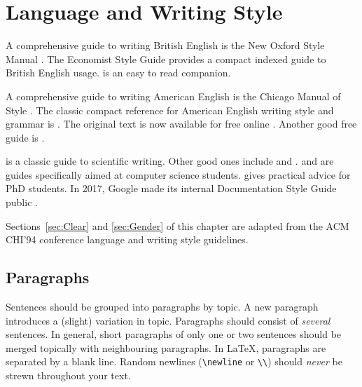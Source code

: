%
%
% 
% 
% 


\chapter{Language and Writing Style}

\label{chap:Style}


A comprehensive guide to writing British English is the New Oxford
Style Manual \parencite{NewOxfordStyleManual-3Ed}. The Economist Style
Guide \parencite{EconomistStyleGuide-12Ed} provides a compact indexed guide
to British English usage. \textcite{Zinsser-OnWritingWell-7Ed} is an
easy to read companion.

A comprehensive guide to writing American English is the Chicago
Manual of Style \parencite{ChicagoManualStyle-17Ed}.  The classic
compact reference for American English writing style and grammar is
\textcite{StrunkWhite-4Ed}. The original text is now available for
free online \parencite{Strunk-1Ed}. Another good free guide is
\textcite{NASAGuide}.

\textcite{Alley-CraftScientificWriting-4Ed} is a classic guide to
scientific writing. Other good ones include
\textcite{Booth-CraftResearch-4Ed} and
\textcite{Booth-CommunicatingScience-2Ed}.
%
\textcite{Zobel-WritingCompSci} and \textcite{BugsInWriting} are guides
specifically aimed at computer science students.
\textcite{Phillips-HowGetPhD} gives practical advice for PhD
students.
%
In 2017, Google made its internal Documentation Style   Guide
public \parencite{GoogleStyleGuide}.


Sections~\ref{sec:Clear} and \ref{sec:Gender} of this chapter are
adapted from the ACM CHI'94 conference language and writing style
guidelines.




\section{Paragraphs}

Sentences should be grouped into paragraphs by topic. A new paragraph
introduces a (slight) variation in topic. Paragraphs should consist of
\emph{several} sentences. In general, short paragraphs of only one or
two sentences should be merged topically with neighbouring paragraphs.
%
In \LaTeX, paragraphs are separated by a blank line. Random newlines
({\smaller\verb|\newline|} or {\smaller\verb|\\|}) should \emph{never}
be strewn throughout your text.

